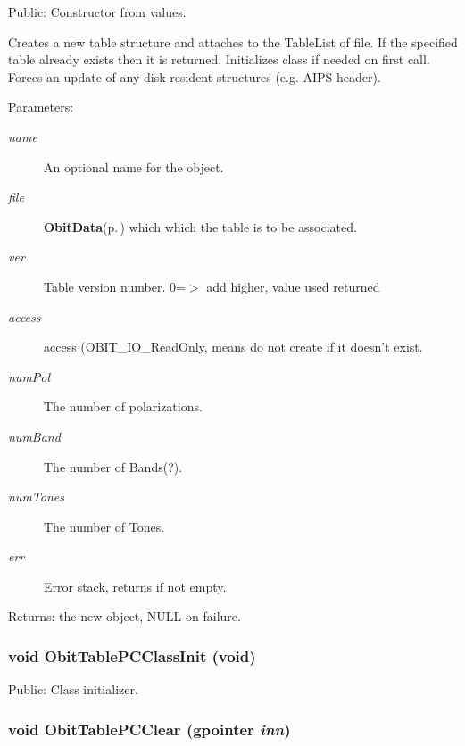 Public: Constructor from values. 

Creates a new table structure and attaches to the Table\-List of file. If the specified table already exists then it is returned. Initializes class if needed on first call. Forces an update of any disk resident structures (e.g. AIPS header). \begin{Desc}
\item[Parameters:]
\begin{description}
\item[{\em name}]An optional name for the object. \item[{\em file}]{\bf Obit\-Data}{\rm (p.\,\pageref{structObitData})} which which the table is to be associated. \item[{\em ver}]Table version number. 0=$>$ add higher, value used returned \item[{\em access}]access (OBIT\_\-IO\_\-Read\-Only, means do not create if it doesn't exist. \item[{\em num\-Pol}]The number of polarizations. \item[{\em num\-Band}]The number of Bands(?). \item[{\em num\-Tones}]The number of Tones. \item[{\em err}]Error stack, returns if not empty. \end{description}
\end{Desc}
\begin{Desc}
\item[Returns:]the new object, NULL on failure. \end{Desc}
\subsubsection{\setlength{\rightskip}{0pt plus 5cm}void Obit\-Table\-PCClass\-Init (void)}\label{ObitTablePC_8c_a27}


Public: Class initializer. 

\subsubsection{\setlength{\rightskip}{0pt plus 5cm}void Obit\-Table\-PCClear (gpointer {\em inn})}\label{ObitTablePC_8c_a9}


